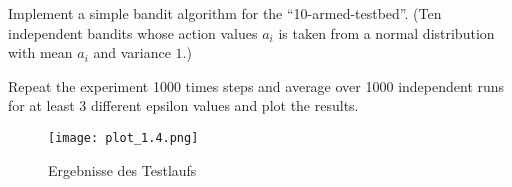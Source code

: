 
\begin{exercise}

Implement a simple bandit algorithm for the ``10-armed-testbed''.
(Ten independent bandits whose action values $a_i$ is taken from a normal distribution
with mean $a_i$ and variance $1$.)

Repeat the experiment 1000 times steps and average over 1000 independent runs for at least
3 different epsilon values and plot the results.
\end{exercise}


\begin{solution}

\begin{figure}[H]
  \texttt{[image: plot\_1.4.png]}
  \caption{Ergebnisse des Testlaufs}
  \label{fig:plot1}
\end{figure}

\end{solution}

